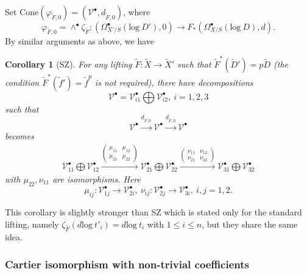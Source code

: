 \documentclass[12pt, a4paper]{article}
\newtheorem{corollary}{Corollary}[section]
\begin{document}
Set $\mathrm{Cone}(\varphi_{\tilde F,0})=(\mathcal V^\bullet,d_{\tilde F,0})$, where
$$
\varphi_{\tilde F,0}=\wedge^\bullet\zeta_{\tilde F}:(\Omega^\bullet_{X'/S}(\mathrm{log}~D'),0)\to F_*(\Omega^\bullet_{X/S}(\mathrm{log}~D),d).
$$
By similar arguments as above, we have 
\begin{corollary}[SZ]\label{log Cartier}
For any lifting $\tilde F:\tilde X\to\tilde X'$ such that $\tilde F^*(\tilde D')=p\tilde D$ (the condition $\tilde F^*(\tilde f')=\tilde f^p$ is not required), there have decompositions
$$
\mathcal V^\bullet=\mathcal V^\bullet_{i1}\bigoplus \mathcal V^\bullet_{i2},~i=1,2,3$$
such that 
$$
\mathcal V^\bullet\xrightarrow{d_{\tilde F,0}}\mathcal V^\bullet\xrightarrow{d_{\tilde F,0}}\mathcal V^\bullet
$$
becomes
\begin{eqnarray}\label{decomposable exact}
\mathcal V^\bullet_{11}\bigoplus \mathcal V^\bullet_{12}\xrightarrow{ \left(\begin{matrix}\mu_{11}&\mu_{12}\\
\mu_{21}&\mu_{22}\end{matrix}\right)}\mathcal V^\bullet_{21}\bigoplus \mathcal V^\bullet_{22}\xrightarrow{ \left(\begin{matrix}\nu_{11}&\nu_{12}\\
\nu_{21}&\nu_{22}\end{matrix}\right)}\mathcal V^\bullet_{31}\bigoplus \mathcal V^\bullet_{32}	\end{eqnarray}	
with $\mu_{22},\nu_{11}$	are isomorphisms. Here
$$
\mu_{ij}:\mathcal V^\bullet_{1j}\to \mathcal V^\bullet_{2i},~\nu_{ij}:\mathcal V^\bullet_{2j}\to \mathcal V^\bullet_{3i},~i,j=1,2.
$$	
\end{corollary}
This corollary is slightly stronger than SZ which is stated only for the standard lifting, namely $\zeta_{\tilde F}(d\mathrm{log}~t'_i)=d\mathrm{log}~t_i$ with $1\leq i\leq n$, but they share the same idea. 
\subsubsection{Cartier isomorphism with non-trivial coefficients}
\end{document}
